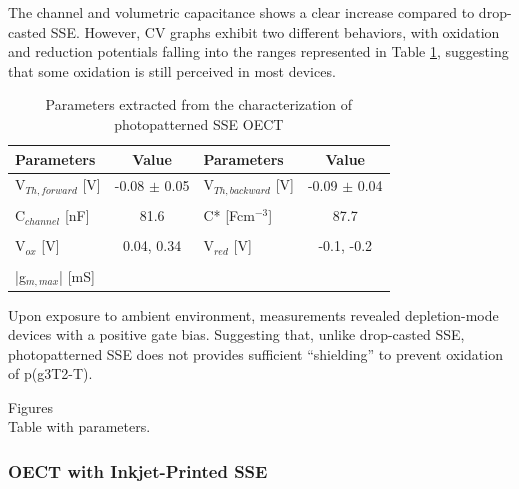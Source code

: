 
The channel and volumetric capacitance shows a clear increase compared to drop-casted SSE. %
However, CV graphs exhibit two different behaviors, with oxidation and reduction potentials falling into the ranges represented in Table \ref{tab:photofom}, suggesting that some oxidation is still perceived in most devices.

\begin{table}[ht]
\centering
\caption{Parameters extracted from the characterization of photopatterned SSE OECT}
\begin{tabular}{l|c||l|c}
Parameters & Value & Parameters & Value \\\hline \hline
V$_{Th,forward}$ [V] & -0.08 $\pm$ 0.05 & V$_{Th,backward}$ [V] & -0.09 $\pm$ 0.04\\
& & &\\[-1em]
C$_{channel}$ [nF] & 81.6 & C* [Fcm$^{-3}$] & 87.7 \\
& & &\\[-1em]
V$_{ox}$ [V] & 0.04, 0.34  & V$_{red}$ [V] & -0.1, -0.2 \\
& & &\\[-1em]
|g$_{m,max}$| [mS] &  &  &\\\hline
\end{tabular}
\label{tab:photofom}
\end{table}

Upon exposure to ambient environment, measurements revealed depletion-mode devices with a positive gate bias. Suggesting that, unlike drop-casted SSE, photopatterned SSE does not provides sufficient ``shielding'' to prevent oxidation of p(g3T2-T).

Figures\\
Table with parameters.

\newpage
\subsubsection{OECT with Inkjet-Printed SSE}%

